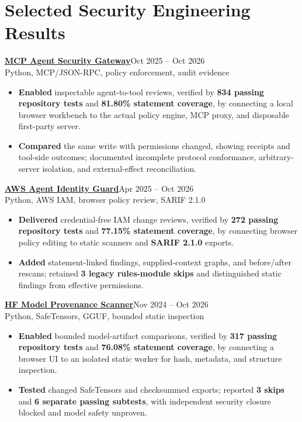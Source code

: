 \documentclass[letterpaper,10pt]{article}
\newcommand{\proj}[3]{\noindent\textbf{#1}\hfill{\fontsize{10}{12}\selectfont #3}\\{\fontsize{10}{12}\selectfont #2}\vspace{1.5pt}}
\begin{document}
\newpage
{}\vspace{1pt}

\section{Selected Security Engineering Results}
\proj{\href{https://github.com/poojakira/mcp-agent-security-gateway/blob/4f83f01a3ed8aca5639143fe2179afb0f864f46e/release-evidence/RELEASE_ASSESSMENT.md}{MCP Agent Security Gateway}}{Python, MCP/JSON-RPC, policy enforcement, audit evidence}{Oct 2025 -- Oct 2026}
\begin{itemize}
\item \textbf{Enabled} inspectable agent-to-tool reviews, verified by \textbf{834 passing repository tests} and \textbf{81.80\% statement coverage}, by connecting a local browser workbench to the actual policy engine, MCP proxy, and disposable first-party server.
\item \textbf{Compared} the same write with permissions changed, showing receipts and tool-side outcomes; documented incomplete protocol conformance, arbitrary-server isolation, and external-effect reconciliation.
\end{itemize}

\proj{\href{https://github.com/poojakira/aws-agent-identity-guard/blob/a396433a4070a0ddc68aa83f9b1093e87fc3224f/release-evidence/RELEASE_ASSESSMENT.md}{AWS Agent Identity Guard}}{Python, AWS IAM, browser policy review, SARIF 2.1.0}{Apr 2025 -- Oct 2026}
\begin{itemize}
\item \textbf{Delivered} credential-free IAM change reviews, verified by \textbf{272 passing repository tests} and \textbf{77.15\% statement coverage}, by connecting browser policy editing to static scanners and \textbf{SARIF 2.1.0} exports.
\item \textbf{Added} statement-linked findings, supplied-context graphs, and before/after rescans; retained \textbf{3 legacy rules-module skips} and distinguished static findings from effective permissions.
\end{itemize}


\proj{\href{https://github.com/poojakira/hf-model-provenance-scanner/blob/ed25d66b72e374f86e2975930b0ed83b9acf3c09/release-evidence/RELEASE_ASSESSMENT.md}{HF Model Provenance Scanner}}{Python, SafeTensors, GGUF, bounded static inspection}{Nov 2024 -- Oct 2026}
\begin{itemize}
\item \textbf{Enabled} bounded model-artifact comparisons, verified by \textbf{317 passing repository tests} and \textbf{76.08\% statement coverage}, by connecting a browser UI to an isolated static worker for hash, metadata, and structure inspection.
\item \textbf{Tested} changed SafeTensors and checksummed exports; reported \textbf{3 skips} and \textbf{6 separate passing subtests}, with independent security closure blocked and model safety unproven.
\end{itemize}
\end{document}
